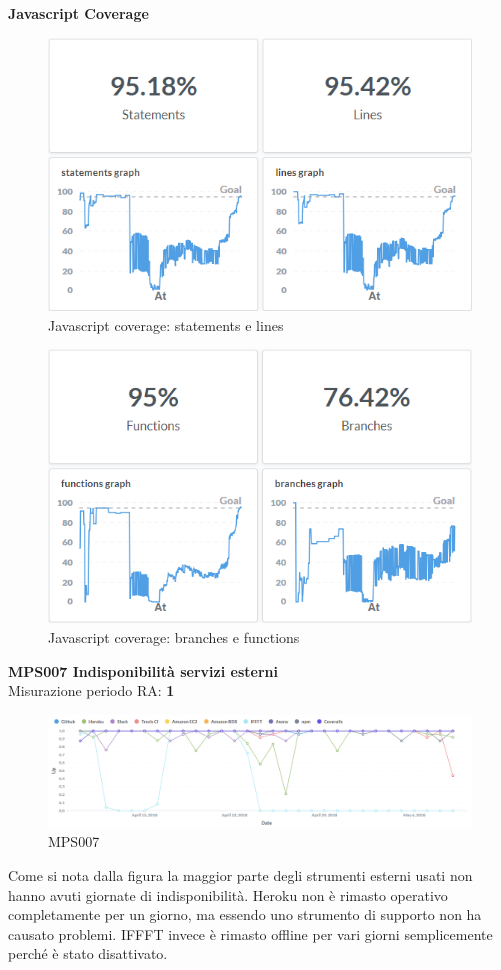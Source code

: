 \documentclass[PianoDiQualifica.tex]{subfiles}
\begin{document}
\textbf{Javascript Coverage}\\
\begin{figure}[H]
	\centering
	\includegraphics[width=0.7\linewidth]{RA/JsCoverage1}
	\caption{Javascript coverage: statements e lines}
	\label{fig:processi}
\end{figure}
\begin{figure}[H]
	\centering
	\includegraphics[width=0.7\linewidth]{RA/JsCoverage2}
	\caption{Javascript coverage: branches e functions}
	\label{fig:processi}
\end{figure}
\newpage

\textbf{MPS007 Indisponibilità servizi esterni}\\
Misurazione periodo RA: \textbf{1}
\begin{figure}[H]
	\centering
	\includegraphics[width=1\linewidth]{RA/MPS007}
	\caption{MPS007}
	\label{fig:processi}
\end{figure}
Come si nota dalla figura la maggior parte degli strumenti esterni usati non hanno avuti giornate di indisponibilità.
Heroku non è rimasto operativo completamente per un giorno, ma essendo uno strumento di supporto non ha causato problemi. IFFFT invece è rimasto offline per vari giorni semplicemente perché è stato disattivato.  \\
\end{document}
